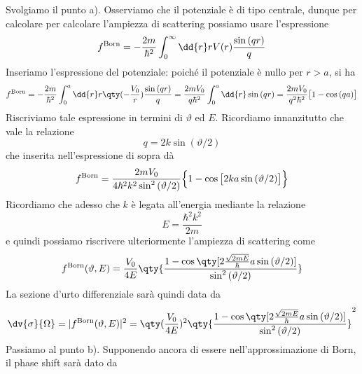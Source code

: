 \begin{soluzione}
   Svolgiamo il punto a). Osserviamo che il potenziale è di tipo centrale, dunque per calcolare per calcolare l'ampiezza di scattering possiamo usare l'espressione
   \begin{equation*}
      f^{\rm Born}
      =-\frac{2m}{\hbar^2} \int_{0}^{\infty} \dd{r} r V(r) \frac{\sin{(qr)}}{q}
   \end{equation*}
   Inseriamo l'espressione del potenziale: poiché il potenziale è nullo per $r>a$, si ha
   \begin{equation*}
      f^{\rm Born}
      =-\frac{2m}{\hbar^2} \int_{0}^{a} \dd{r} r \qty( -\frac{V_0}{r} ) \frac{\sin{(qr)}}{q}
      =\frac{2m V_0}{q \hbar^2} \int_{0}^{a} \dd{r} \sin{(qr)}
      =\frac{2m V_0}{q^2 \hbar^2} \bigl[ 1 - \cos{(qa)} \bigr]
   \end{equation*}
   Riscriviamo tale espressione in termini di $\vartheta$ ed $E$. Ricordiamo innanzitutto che vale la relazione
   \begin{equation*}
      q
      =2k \sin{(\vartheta/2)}
   \end{equation*}
   che inserita nell'espressione di sopra dà
   \begin{equation*}
      f^{\rm Born}
      =\frac{2m V_0}{4 \hbar^2 k^2 \sin^2{(\vartheta/2)}} \Bigl\{ 1 - \cos{\bigl[ 2ka \sin{(\vartheta/2)} \bigr] } \Bigr\}
   \end{equation*}
   Ricordiamo che adesso che $k$ è legata all'energia mediante la relazione
   \begin{equation*}
      E
      =\frac{\hbar^2 k^2}{2m}
   \end{equation*}
   e quindi possiamo riscrivere ulteriormente l'ampiezza di scattering come
   \begin{equation*}
      f^{\rm Born}(\vartheta,E)
      =\frac{V_0}{4E} \qty{ \frac{1 - \cos{\qty[ 2 \frac{\sqrt{2mE}}{\hbar} a \sin{(\vartheta/2)} ] }}{\sin^2{(\vartheta/2)}} }
   \end{equation*}
   La sezione d'urto differenziale sarà quindi data da
   \begin{equation*}
      \dv{\sigma}{\Omega}
      =|f^{\rm Born}(\vartheta,E)|^2
      =\qty( \frac{V_0}{4E} )^2 \qty{ \frac{1 - \cos{\qty[ 2 \frac{\sqrt{2mE}}{\hbar} a \sin{(\vartheta/2)} ] }}{\sin^2{(\vartheta/2)}} }^2
   \end{equation*}
   Passiamo al punto b). Supponendo ancora di essere nell'approssimazione di Born, il phase shift sarà dato da
   \begin{equation*}

\end{equation*}
\end{soluzione}
